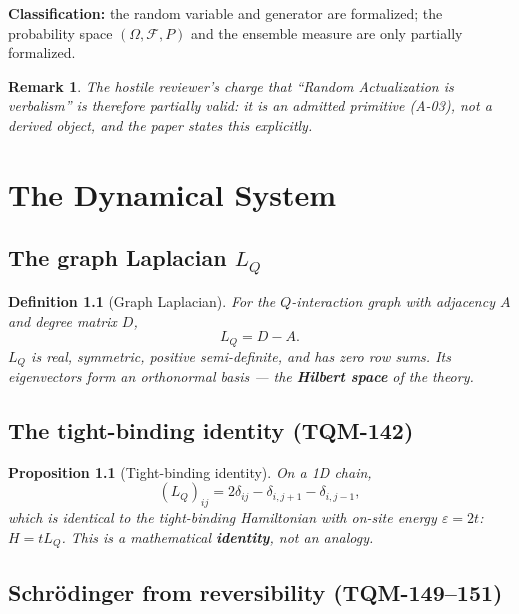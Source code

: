 \documentclass[11pt,twoside]{book}
\newtheorem{proposition}[theorem]{Proposition}
\newtheorem{definition}[theorem]{Definition}
\newtheorem{remark}[theorem]{Remark}
\begin{document}
\textbf{Classification:} the random variable and generator are formalized; the probability
space $(\Omega,\mathcal F,P)$ and the ensemble measure are only partially formalized.

\begin{remark}
The hostile reviewer's charge that ``Random Actualization is verbalism'' is therefore
\emph{partially valid}: it is an \emph{admitted} primitive (A-03), not a derived object,
and the paper states this explicitly.
\end{remark}


\chapter{The Dynamical System}
\label{ch:dynamics}

\section{The graph Laplacian $L_Q$}

\begin{definition}[Graph Laplacian]
For the $Q$-interaction graph with adjacency $A$ and degree matrix $D$,
\begin{equation}
L_Q = D - A .
\end{equation}
$L_Q$ is real, symmetric, positive semi-definite, and has zero row sums. Its eigenvectors
form an orthonormal basis — the \textbf{Hilbert space} of the theory.
\end{definition}

\section{The tight-binding identity (TQM-142)}

\begin{proposition}[Tight-binding identity]
On a 1D chain,
\begin{equation}
(L_Q)_{ij} = 2\delta_{ij} - \delta_{i,j+1} - \delta_{i,j-1},
\end{equation}
which is \emph{identical} to the tight-binding Hamiltonian with on-site energy
$\varepsilon=2t$: $H = t L_Q$. This is a mathematical \textbf{identity}, not an analogy.
\end{proposition}

\section{Schr\"odinger from reversibility (TQM-149--151)}
\end{document}
